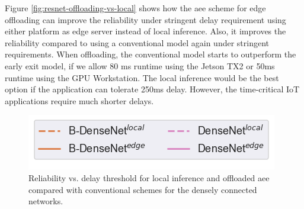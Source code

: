 Figure \ref{fig:resnet-offloading-vs-local} shows how the \gls{aee} scheme for edge offloading can improve the reliability under stringent delay requirement using either platform as edge server instead of local inference. Also, it improves the reliability compared to using a conventional model again under stringent requirements. When offloading, the conventional model starts to outperform the early exit model, if we allow 80 ms runtime using the Jetson TX2 or 50ms runtime using the GPU Workstation. The local inference would be the best option if the application can tolerate 250ms delay. However, the time-critical IoT applications require much shorter delays. 
\begin{figure}
	\captionsetup[subfigure]{justification=centering, farskip=0pt,captionskip=0pt}
	\centering
	\includegraphics[width=.3\linewidth]{figures/edge/gpu_b-densenet_offloading_vs_local_legend}
	\hfill
	\hfill
	\caption[Offloading comparison of densely connected networks]{Reliability vs. delay threshold for local inference and offloaded \gls{aee} compared with conventional schemes for the densely connected networks.}
	\label{fig:densenet-offloading-vs-local}
\end{figure}

